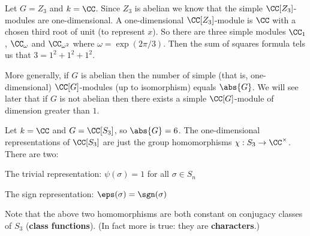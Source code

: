 \begin{exam}
	\leavevmode
	\begin{enum}
		\io
		Let $G=Z_3$ and $k=\CC$.
		Since $Z_3$ is abelian we know that the simple $\CC[Z_3]$-modules are one-dimensional.
		A one-dimensional $\CC[Z_3]$-module is $\CC$ with a chosen third root of unit (to represent $x$).
		So there are three simple modules $\CC_1$, $\CC_\omega$ and $\CC_{\omega^2}$ where $\omega=\exp(2\pi/3)$.
		Then the sum of squares formula tels us that $3=1^2+1^2+1^2$.
		
		More generally, if $G$ is abelian then the number of simple (that is, one-dimensional) $\CC[G]$-modules (up to isomorphism) equals $\abs{G}$.
		We will see later that if $G$ is not abelian then there exists a simple $\CC[G]$-module of dimension greater than $1$.
		
		\io
		Let $k=\CC$ and $G=\CC[S_3]$, so $\abs{G}=6$.
		The one-dimensional representations of $\CC[S_3]$ are just the group homomorphisms $\chi: S_3 \to \CC^\times$.
		There are two:
		\begin{enum}
			\io
			The trivial representation: $\psi(\sigma)=1$ for all $\sigma\in S_n$
			
			\io
			The sign representation: $\eps(\sigma)=\sgn(\sigma)$
		\end{enum}
		Note that the above two homomorphisms are both constant on conjugacy classes of $S_3$ (\textbf{class functions}).
		(In fact more is true: they are \textbf{characters}.)
		

\end{enum}
\end{exam}
